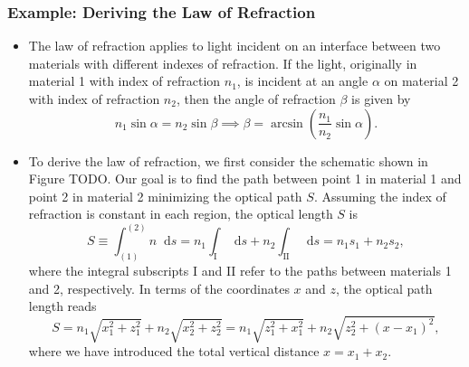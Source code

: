 \documentclass[11pt, a4paper]{article}
\newcommand{\diff}{\mathop{}\!\mathrm{d}} %
\begin{document}
\subsubsection{Example: Deriving the Law of Refraction}
\begin{itemize}
    \item The law of refraction applies to light incident on an interface between two materials with different indexes of refraction. If the light, originally in material 1 with index of refraction $ n_{1} $, is incident at an angle $ \alpha $ on material 2 with index of refraction $ n_{2} $, then the angle of refraction $ \beta $ is given by
    \begin{equation*}
        n_{1} \sin \alpha = n_{2} \sin \beta \implies \beta = \arcsin \left( \frac{n_{1}}{n_{2}} \sin \alpha \right).
    \end{equation*}
    

    \item To derive the law of refraction, we first consider the schematic shown in Figure TODO. Our goal is to find the path between point 1 in material 1 and point 2 in material 2 minimizing the optical path $ S $. Assuming the index of refraction is constant in each region, the optical length $ S $ is
    \begin{equation*}
        S \equiv \int_{(1)}^{(2)} n \diff s = n_{1} \int_{\mathrm{I}} \diff s + n_{2} \int_{\mathrm{II}} \diff s = n_{1} s_{1} + n_{2} s_{2},
    \end{equation*}
    where the integral subscripts I and II refer to the paths between materials 1 and 2, respectively. In terms of the coordinates $ x $ and $ z $, the optical path length reads
    \begin{equation*}
        S = n_{1} \sqrt{x_{1}^{2} + z_{1}^{2}} + n_{2} \sqrt{x_{2}^{2} + z_{2}^{2}} = n_{1} \sqrt{z_{1}^{2} + x_{1}^{2}} + n_{2} \sqrt{z_{2}^{2} + (x - x_{1})^{2}},
    \end{equation*}
    where we have introduced the total vertical distance $ x = x_{1} + x_{2} $.
    

\end{itemize}
\end{document}

